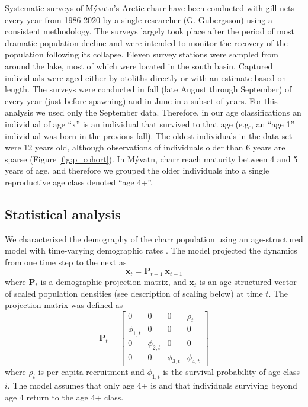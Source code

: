 \documentclass[11pt]{article}
\begin{document}
Systematic surveys of M\'{y}vatn’s Arctic charr have been conducted 
with gill nets every year from 1986-2020 by a single researcher (G. Gu{\dh}bergsson) 
using a consistent methodology. 
The surveys largely took place after the period of most dramatic population decline 
\citep{gudbergsson2004} 
and were intended to monitor the recovery of the population following its collapse. 
Eleven survey stations were sampled from around the lake,
most of which were located in the south basin. 
Captured individuals were aged either by otoliths directly or 
with an estimate based on length.
The surveys were conducted in fall (late August through September) 
of every year (just before spawning) and in June in a subset of years. 
For this analysis we used only the September data. 
Therefore, in our age classifications an individual of age ``x'' is an individual 
that survived to that age (e.g., an ``age 1'' individual was born in the previous fall). 
The oldest individuals in the data set were 12 years old, although observations 
of individuals older than 6 years are sparse
(Figure \ref{fig:p_cohort}). 
In M\'{y}vatn, charr reach maturity between 4 and 5 years of age, 
and therefore we grouped the older individuals into a single reproductive age class
denoted ``age 4+''.

\subsection*{Statistical analysis} 

We characterized the demography of the charr population 
using an age-structured model \citep{caswell2001matrix}
with time-varying demographic rates \citep{zeng1998, nielsen2014estimation}.
The model projected the dynamics from one time step to the next as
%
\begin{equation} \label{eq:XPX}
    \mathbf{x}_t = \mathbf{P}_{t-1}~\mathbf{x}_{t-1}
\end{equation}
%
where $\mathbf{P}_{t}$ is a demographic projection matrix,
and $\mathbf{x}_t$ is an age-structured vector of scaled population densities 
(see description of scaling below) at time $t$.
%
The projection matrix was defined as
%
\begin{equation} \label{eq:matrix}
\mathbf{P}_{t} = 
\left[
\begin{array}{cccccccc}
    0             & 0             & 0             & \rho_{t}     \\
    \phi_{1,t}    & 0             & 0             & 0            \\
    0             & \phi_{2,t}    & 0             & 0            \\
    0             & 0             & \phi_{3,t}    & \phi_{4,t}
    \end{array}
\right]
\end{equation}
%
where $\rho_{t}$ is per capita recruitment 
and $\phi_{1,t}$ is the survival probability of age class $i$. 
The model assumes that only age 4+ is
and that individuals surviving beyond age 4 return to the age 4+ class.
\end{document}
